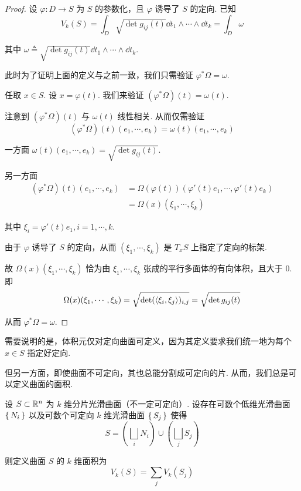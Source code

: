 \begin{proof}
    设 $\varphi:D\to S$ 为 $S$ 的参数化，且 $\varphi$ 诱导了 $S$ 的定向. 已知
$$
V_k(S)=\int_D\sqrt{\det g_{ij}(t)}\dd t_1\wedge\cdots\wedge\dd t_k=\int_D\omega
$$

    其中 $\omega\triangleq\sqrt{\det g_{ij}(t)}\dd t_1\wedge\cdots\wedge\dd t_k$.

    此时为了证明上面的定义与之前一致，我们只需验证 $\varphi^*\Omega=\omega$.

    任取 $x\in S$. 设 $x=\varphi(t)$. 我们来验证 $(\varphi^*\Omega)(t)=\omega(t)$.

    注意到 $(\varphi^*\Omega)(t)$ 与 $\omega(t)$ 线性相关. 从而仅需验证
$$
(\varphi^*\Omega)(t)(e_1,\cdots,e_k)=\omega(t)(e_1,\cdots,e_k)
$$

    一方面 $\omega(t)(e_1,\cdots,e_k)=\sqrt{\det g_{ij}(t)}$.

    另一方面
$$
\begin{aligned}
    (\varphi^*\Omega)(t)(e_1,\cdots,e_k)&=\Omega(\varphi(t))(\varphi'(t)e_1,\cdots,\varphi'(t)e_k)\\
    &=\Omega(x)(\xi_1,\cdots,\xi_k)
\end{aligned}
$$

    其中 $\xi_i=\varphi'(t)e_1,i=1,\cdots,k$.
    
    由于 $\varphi$ 诱导了 $S$ 的定向，从而 $(\xi_1,\cdots,\xi_k)$ 是 $T_xS$ 上指定了定向的标架.
    
    故 $\Omega(x)(\xi_1,\cdots,\xi_k)$ 恰为由 $\xi_1,\cdots,\xi_k$ 张成的平行多面体的有向体积，且大于 $0$. 即
$$
\Omega(x)(\xi_1,\cdots,\xi_k)=\sqrt{\det(\left\langle{\xi_i,\xi_j}\right\rangle)_{i,j}}=\sqrt{\det g_{ij}(t)}
$$

    从而 $\varphi^*\Omega=\omega$.
\end{proof}

\begin{hint}
    需要说明的是，体积元仅对定向曲面可定义，因为其定义要求我们统一地为每个 $x\in S$ 指定好定向.

    但另一方面，即使曲面不可定向，其也总能分割成可定向的片. 从而，我们总是可以定义曲面的面积.
\end{hint}

\begin{definition}
    设 $S\subset\mathbb{R}^n$ 为 $k$ 维分片光滑曲面（不一定可定向）. 设存在可数个低维光滑曲面 $\set{N_i}$ 以及可数个可定向 $k$ 维光滑曲面 $\set{S_j}$ 使得
$$
S=\left(\bigsqcup_iN_i\right)\cup\left(\bigsqcup_jS_j\right)
$$

    则定义曲面 $S$ 的 $k$ 维面积为
$$
V_k(S)=\sum_{j}V_k(S_j)
$$
\end{definition}

